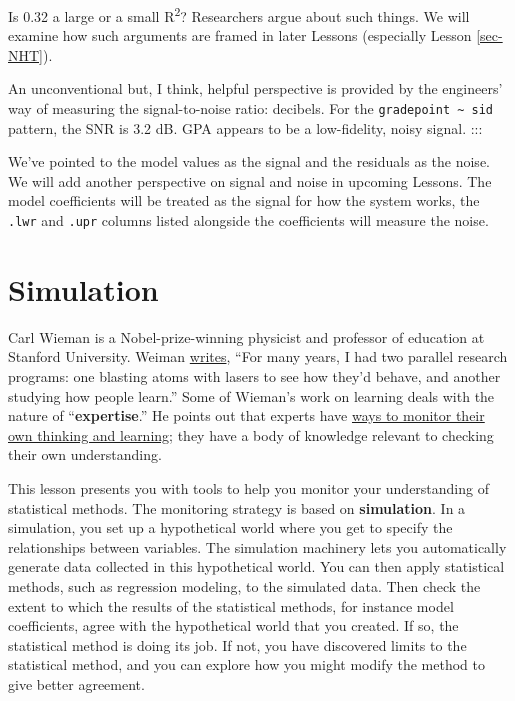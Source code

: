 \documentclass[
  letterpaper,
  DIV=11,
  numbers=noendperiod,
  oneside]{scrartcl}
\begin{document}
Is 0.32 a large or a small R\textsuperscript{2}? Researchers argue about
such things. We will examine how such arguments are framed in later
Lessons (especially Lesson \ref{sec-NHT}).

An unconventional but, I think, helpful perspective is provided by the
engineers' way of measuring the signal-to-noise ratio: decibels. For the
\texttt{gradepoint\ \textasciitilde{}\ sid} pattern, the SNR is 3.2 dB.
GPA appears to be a low-fidelity, noisy signal. :::

\begin{tcolorbox}[enhanced jigsaw, colbacktitle=quarto-callout-note-color!10!white, opacityback=0, breakable, opacitybacktitle=0.6, colback=white, coltitle=black, arc=.35mm, title=\textcolor{quarto-callout-note-color}{\faInfo}\hspace{0.5em}{A preview of things to come}, left=2mm, colframe=quarto-callout-note-color-frame, rightrule=.15mm, bottomrule=.15mm, leftrule=.75mm, bottomtitle=1mm, toptitle=1mm, titlerule=0mm, toprule=.15mm]

We've pointed to the model values as the signal and the residuals as the
noise. We will add another perspective on signal and noise in upcoming
Lessons. The model coefficients will be treated as the signal for how
the system works, the \texttt{.lwr} and \texttt{.upr} columns listed
alongside the coefficients will measure the noise.

\end{tcolorbox}

\newpage

\section{Simulation}\label{sec-simulations}

Carl Wieman is a Nobel-prize-winning physicist and professor of
education at Stanford University. Weiman
\href{https://ed.stanford.edu/about/community/carl-wieman}{writes},
``For many years, I had two parallel research programs: one blasting
atoms with lasers to see how they'd behave, and another studying how
people learn.'' Some of Wieman's work on learning deals with the nature
of ``\textbf{expertise}.'' He points out that experts have
\href{https://www.youtube.com/watch?v=12oJzN5I4H8}{ways to monitor their
own thinking and learning}; they have a body of knowledge relevant to
checking their own understanding.

This lesson presents you with tools to help you monitor your
understanding of statistical methods. The monitoring strategy is based
on \textbf{simulation}. In a simulation, you set up a hypothetical world
where you get to specify the relationships between variables. The
simulation machinery lets you automatically generate data collected in
this hypothetical world. You can then apply statistical methods, such as
regression modeling, to the simulated data. Then check the extent to
which the results of the statistical methods, for instance model
coefficients, agree with the hypothetical world that you created. If so,
the statistical method is doing its job. If not, you have discovered
limits to the statistical method, and you can explore how you might
modify the method to give better agreement.
\end{document}
